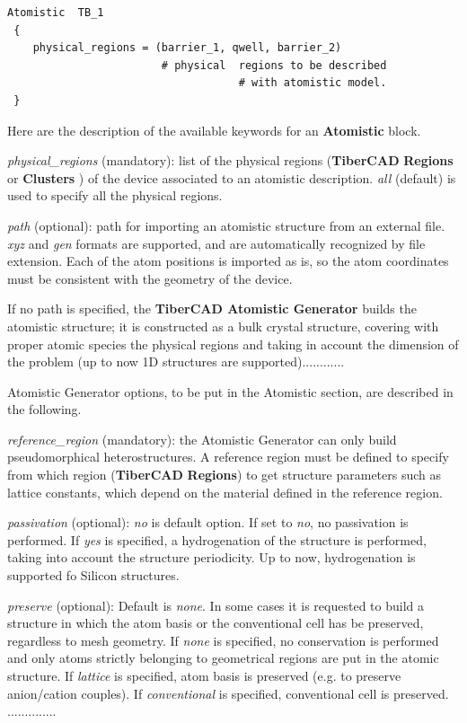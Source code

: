 \begin{verbatim}
Atomistic  TB_1
 {
    physical_regions = (barrier_1, qwell, barrier_2) 
			            # physical  regions to be described 
                                    # with atomistic model.
 }
\end{verbatim}

Here are the  description of  the available keywords for an \textbf{Atomistic} block.

\textit{physical\_regions} (mandatory): list of the physical regions (\textbf{TiberCAD} \textbf{Regions} or \textbf{Clusters} )  of 
the device associated to an atomistic description. \textit{all}  (default)  is used to specify all the physical regions.

\textit{path} (optional): path for importing an atomistic structure from an external file. \textit{xyz} and \textit{gen} formats are supported, 
and are automatically recognized by file extension. Each of the atom positions is imported as is, so the atom  coordinates must be consistent with the  geometry of the device.

If no path is specified, the \textbf{TiberCAD Atomistic Generator}  builds the atomistic structure; it is  constructed as a bulk crystal
structure, covering with proper atomic species the physical regions and taking in account the dimension  of the problem (up to now 1D
structures are supported)............ 

Atomistic Generator options, to be put in the Atomistic section, are  described in the  following.

\textit{reference\_region} (mandatory): the Atomistic Generator can only build pseudomorphical heterostructures. A reference region must be defined
to specify from which region (\textbf{TiberCAD} \textbf{Regions})  to get structure parameters such as lattice constants, which  
depend  on the material defined in the reference region.

\textit{passivation} (optional): \textit{no} is default option. If set to \textit{no}, no passivation is performed. If \textit{yes} is specified, a hydrogenation of the structure
is performed, taking into account the structure periodicity. Up to now, hydrogenation is supported fo Silicon structures.

\textit{preserve} (optional): Default is  \textit{none}.  In some cases it is requested to build a structure in which the atom basis or the conventional cell has be preserved, 
regardless to mesh geometry. 
If \textit{none} is specified, no conservation is performed and only atoms strictly belonging to 
geometrical regions are put in  the atomic structure. If \textit{lattice} is specified, atom basis is preserved (e.g. to preserve anion/cation couples). If 
\textit{conventional} is specified, conventional cell is preserved. ..............

